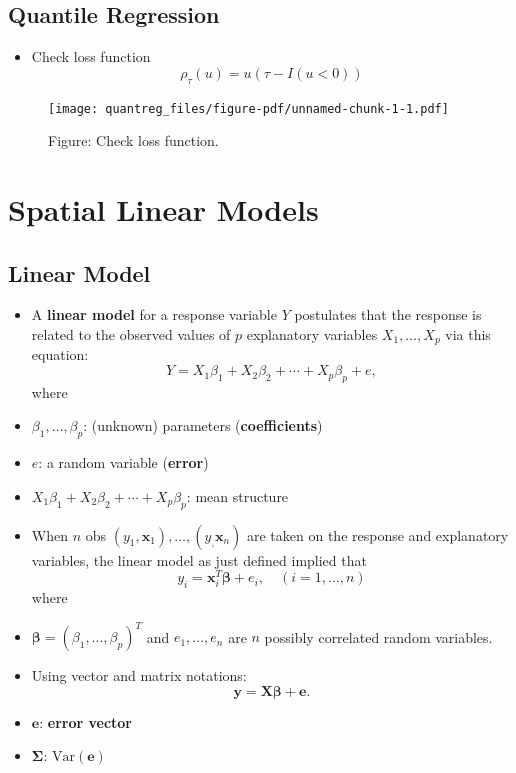 \documentclass[
  letterpaper,
  DIV=11,
  numbers=noendperiod]{scrreprt}
\providecommand{\tightlist}{%
  \setlength{\itemsep}{0pt}\setlength{\parskip}{0pt}}\usepackage{longtable,booktabs,array}
\theoremstyle{definition}
\theoremstyle{plain}
\theoremstyle{definition}
\theoremstyle{definition}
\theoremstyle{remark}
\begin{document}
\section{Quantile Regression}\label{quantile-regression-1}

\begin{itemize}
\tightlist
\item
  Check loss function \[
  \rho_\tau (u) = u(\tau - I(u<0))
  \]
\end{itemize}

\begin{figure}[H]

{\centering \texttt{[image: quantreg\_files/figure-pdf/unnamed-chunk-1-1.pdf]}

}

\caption{Figure: Check loss function.}

\end{figure}%

\chapter{Spatial Linear Models}\label{spatial-linear-models}

\section{Linear Model}\label{linear-model}

\begin{itemize}
\item
  A \textbf{linear model} for a response variable \(Y\) postulates that
  the response is related to the observed values of \(p\) explanatory
  variables \(X_1, \ldots, X_p\) via this equation: \[
  Y = X_1 \beta_1 + X_2 \beta_2 + \cdots + X_p \beta_p + e,
  \] where
\item
  \(\beta_1, \ldots, \beta_p\): (unknown) parameters
  (\textbf{coefficients})
\item
  \(e\): a random variable (\textbf{error})
\item
  \(X_1 \beta_1 + X_2 \beta_2 + \cdots + X_p \beta_p\): mean structure
\item
  When \(n\) obs \((y_1, \pmb{x}_1), \ldots, (y_, \pmb{x}_n)\) are taken
  on the response and explanatory variables, the linear model as just
  defined implied that \[
  y_i = \pmb{x}_i^T \pmb{\beta} + e_i, \quad{} (i=1,\ldots, n)
  \] where
\item
  \(\pmb{\beta} = (\beta_1, \ldots, \beta_p)^T\) and
  \(e_1, \ldots, e_n\) are \(n\) possibly correlated random variables.
\item
  Using vector and matrix notations: \[
  \pmb{y} = \pmb{X \beta} + \pmb{e}.
  \]
\item
  \(\pmb{e}\): \textbf{error vector}
\item
  \(\pmb{\Sigma}\): \(\text{Var}(\pmb{e})\)
\end{itemize}
\end{document}

